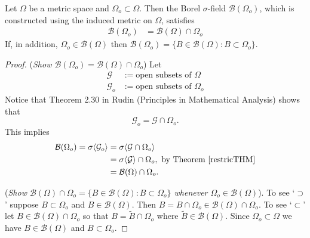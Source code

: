 \begin{theorem}
Let $\Omega$ be a metric space and $\Omega_o\subset \Omega$.  Then the Borel $\sigma$-field $\mathcal B(\Omega_o)$, which is constructed using the induced metric on $\Omega$, satisfies
\begin{align*}
\mathcal B(\Omega_o) &=  \mathcal B(\Omega)\cap \Omega_o
\end{align*}
If, in addition, $\Omega_o\in \mathcal B(\Omega)$ then $\mathcal B(\Omega_o)=  \{ B\in \mathcal B(\Omega): B\subset \Omega_o \}$.
\end{theorem}



\begin{proof}
({\sl Show $ \mathcal B(\Omega_o) = \mathcal B(\Omega)\cap \Omega_o$})
Let
\begin{align*}
\mathcal G &:= \text{open subsets of $\Omega$}\\
\mathcal G_o &:= \text{open subsets of $\Omega_o$}
\end{align*}
Notice that Theorem 2.30 in Rudin (Principles in Mathematical Analysis) shows that
\[ \mathcal G_o  = \mathcal G\cap \Omega_o.\]
This implies
\begin{align*}
\mathcal B(\Omega_o)  = \sigma \langle \mathcal G_o\rangle &=  \sigma\langle \mathcal G \cap\Omega_o \rangle\\
& = \sigma\langle \mathcal G \rangle\cap \Omega_o,\,\,\text{by Theorem \ref{restricTHM}}\\
& = \mathcal B(\Omega)\cap \Omega_o.
\end{align*}


({\sl Show $\mathcal B(\Omega)\cap \Omega_o =  \{ B\in \mathcal B(\Omega): B\subset \Omega_o \}$ whenever $\Omega_o\in \mathcal B(\Omega)$}). To see `$\supset$' suppose $B\subset \Omega_o$ and $B\in \mathcal B(\Omega)$. Then $B = B\cap \Omega_o \in \mathcal B(\Omega)\cap \Omega_o$. To  see `$\subset$' let $B\in  \mathcal B(\Omega)\cap \Omega_o $ so that $B= \tilde B\cap \Omega_o$ where $\tilde B\in \mathcal B(\Omega)$. Since $\Omega_o\subset \Omega$ we have $B\in \mathcal B(\Omega)$ and $B\subset  \Omega_o $.
\end{proof}



